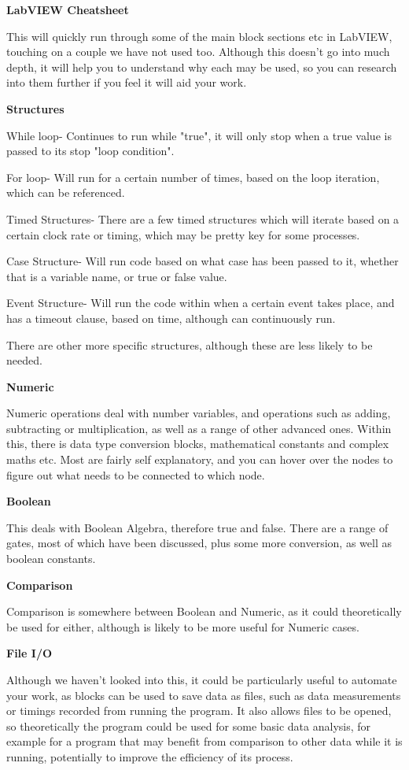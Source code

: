 \documentclass[a4paper,11pt]{report}
\begin{document}
\textbf{LabVIEW Cheatsheet}

This will quickly run through some of the main block sections etc in LabVIEW, touching on a couple we have not used too. Although this doesn't go into much depth, it will help you to understand why each may be used, so you can research into them further if you feel it will aid your work.

\textbf{Structures}

While loop- Continues to run while "true", it will only stop when a true value is passed to its stop "loop condition".

For loop- Will run for a certain number of times, based on the loop iteration, which can be referenced.

Timed Structures- There are a few timed structures which will iterate based on a certain clock rate or timing, which may be pretty key for some processes.

Case Structure- Will run code based on what case has been passed to it, whether that is a variable name, or true or false value.

Event Structure- Will run the code within when a certain event takes place, and has a timeout clause, based on time, although can continuously run.

There are other more specific structures, although these are less likely to be needed.

\textbf{Numeric}

Numeric operations deal with number variables, and operations such as adding, subtracting or multiplication, as well as a range of other advanced ones. Within this, there is data type conversion blocks, mathematical constants and complex maths etc. Most are fairly self explanatory, and you can hover over the nodes to figure out what needs to be connected to which node.

\textbf{Boolean}

This deals with Boolean Algebra, therefore true and false. There are a range of gates, most of which have been discussed, plus some more conversion, as well as boolean constants.

\textbf{Comparison}

Comparison is somewhere between Boolean and Numeric, as it could theoretically be used for either, although is likely to be more useful for Numeric cases.

\textbf{File I/O}

Although we haven't looked into this, it could be particularly useful to automate your work, as blocks can be used to save data as files, such as data measurements or timings recorded from running the program. It also allows files to be opened, so theoretically the program could be used for some basic data analysis, for example for a program that may benefit from comparison to other data while it is running, potentially to improve the efficiency of its process.
\end{document}
